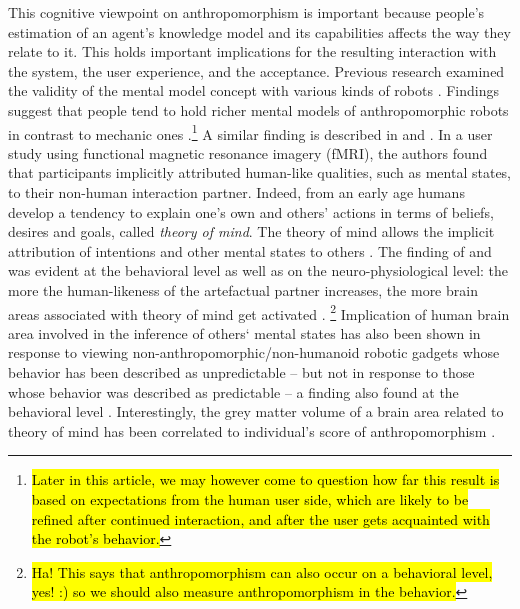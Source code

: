 \documentclass{frontiersSCNS} %
\begin{document}
This cognitive viewpoint on anthropomorphism is important because people's estimation of an agent's knowledge model and its capabilities affects the way they relate to it. This holds important implications for the resulting interaction with the system, the user experience, and the acceptance. Previous research examined the validity of the mental model concept with various kinds of robots \citep{schmitz_concepts_2011,kiesler_mental_2002}. Findings suggest that people tend to hold richer mental models of anthropomorphic robots in contrast to mechanic ones \citep{kiesler_mental_2002}.\footnote{\hl{Later in this article, we may however come to question how far this result is based on expectations from the human user side, which are likely to be refined after continued interaction, and after the user gets acquainted with the robot's behavior.}} 
A similar finding is described in \cite{hegel_understanding_2008} and
\cite{krach_can_2008}. In a user study using functional magnetic resonance
imagery (fMRI), the authors found that participants
implicitly attributed human-like qualities, such as mental states, to their
non-human interaction partner. Indeed, from an early age humans develop a
tendency to explain one's own and others' actions in terms of beliefs, desires
and goals,  called \textit{theory of mind}. The theory of mind allows the implicit attribution of
intentions and other mental states to others \citep{premack1978does,leslie_pretense_1987,Frith2003}.
The finding of \cite{hegel_understanding_2008} and \cite{krach_can_2008} was evident at the behavioral level
as well as on the neuro-physiological level: the more the human-likeness of the
artefactual partner increases, the more brain areas associated with theory of
mind  get activated
\citep{krach_can_2008}. \footnote{\hl{Ha! This says that anthropomorphism can also occur on a behavioral level, yes! :) so we should also measure anthropomorphism in the behavior.}} 
Implication of human brain area involved in the inference of others` mental
states has also been shown in response to viewing
non-anthropomorphic/non-humanoid robotic gadgets whose behavior
has been described as unpredictable -- but not in response to those whose
behavior was described as predictable -- a finding also found at the behavioral
level \citep{Waytz2010}.
Interestingly, the grey matter volume of a brain area related to theory of mind
has been correlated to individual's score of anthropomorphism
\citep{cullen2013individual}.
\end{document}
